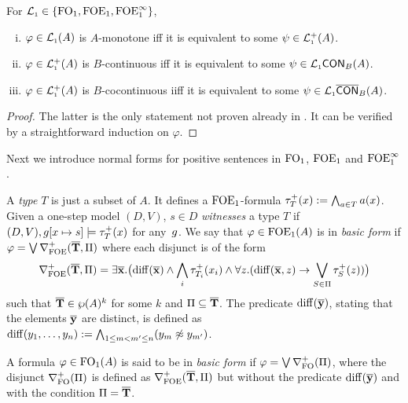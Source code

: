 \begin{theorem} \label{th:onesteplogics-grammars} For $\mathcal{L}_{\scriptscriptstyle 1} \in \{\mathrm{FO}_1, \mathrm{FOE}_1,\mathrm{FOE}^{\infty}_1 \}$,
\begin{enumerate}[(i)]
\item $\varphi  \in \mathcal{L}_{\scriptscriptstyle 1}(A)$ is $A$-monotone iff it is equivalent to some $\psi \in \mathcal{L}_{\scriptscriptstyle 1}^{+}(A)$. 
\item $\varphi  \in \mathcal{L}_{\scriptscriptstyle 1}^{+}(A)$ is $B$-continuous iff it is equivalent to some $\psi \in\mathcal{L}_{\scriptscriptstyle 1}\mathsf{CON}_{B}(A)$. 
\item $\varphi  \in \mathcal{L}_{\scriptscriptstyle 1}^{+}(A)$ is $B$-cocontinuous iiff it is equivalent to some $\psi \in\mathcal{L}_{\scriptscriptstyle 1}\overline{\mathsf{CON}}_{B}(A)$. 
\end{enumerate}
\end{theorem}
\begin{proof} The latter is the only statement not proven already in \cite{CFVZ-ModelTheoryPaper}. It can be verified by a straightforward induction on $\varphi$. \end{proof}



Next we introduce normal forms for positive sentences in $\mathrm{FO}_1$, $\mathrm{FOE}_1$ and $\mathrm{FOE}^{\infty}_1$. 

\begin{definition}%
\label{def:basicform-ofoe}
A \emph{type} $T$ is just a subset of $A$. It defines a $\mathrm{FOE}_1$-formula $\tau^{+}_T(x) \mathrel{: =} \bigwedge_{a \in T} a(x)$. Given a one-step model $(D,V)$, $s \in D$ \emph{witnesses} a type $T$ if $(D,V), g[x\mapsto s] \models \tau^{+}_T(x)$ for any~$g$. We say that $\varphi \in \mathrm{FOE}_1(A)$ is in \emph{basic form} if $\varphi = \bigvee \nabla^+_{\mathrm{FOE}}(\overline{{\mathbf{T}}},\Pi)$ where each disjunct is of the form
%
\begin{equation*}%
\posdbnfofoe{\vlist{T}}{\Pi} = \exists \vlist{x}.\big(\arediff{\vlist{x}} \land \bigwedge_i \tau^{+}_{T_i}(x_i) \land \forall z.(\arediff{\vlist{x},z} \lthen \bigvee_{S\in \Pi} \tau^{+}_S(z))\big)
\end{equation*}
%
such that $\overline{{\mathbf{T}}} \in \wp(A)^k$ for some $k$ and $\Pi \subseteq \overline{{\mathbf{T}}}$.  The predicate $\mathrm{diff}(\overline{{\mathbf{y}}})$, stating that the elements $\overline{{\mathbf{y}}}$ are distinct, is defined as $\mathrm{diff}(y_1,\dots,y_n) := \bigwedge_{1\leq m < m^{\prime} \leq n} (y_m \not\approx y_{m^{\prime}})$.

A formula $\varphi \in \mathrm{FO}_1(A)$ is said to be in \emph{basic form} if $\varphi = \bigvee \nabla^+_{\mathrm{FO}}(\Pi)$, where the disjunct $\nabla^+_{\mathrm{FO}}(\Pi)$ is defined as $\nabla^+_{\mathrm{FOE}}(\overline{{\mathbf{T}}},\Pi)$ but without the predicate $\mathrm{diff}(\overline{{\mathbf{y}}})$ and with the condition $\Pi = \overline{{\mathbf{T}}}$.
\end{definition}

